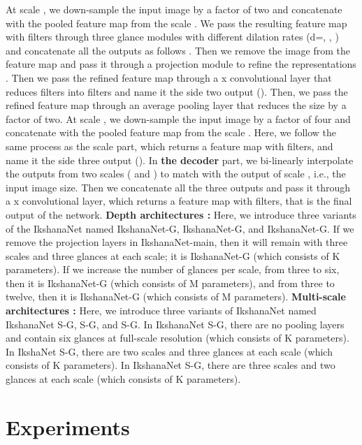\documentclass{article}
\begin{document}
At scale , we down-sample the input image by a factor of two and concatenate with the pooled feature map from the scale  . We pass the resulting feature map with  filters through three glance modules with different dilation rates (d=, , ) and concatenate all the outputs as follows . Then we remove the image from the feature map  and pass it through a  projection module to refine the representations . Then we pass the refined feature map through a x convolutional layer that reduces  filters into  filters and name it the side two output (). Then, we pass the refined feature map through an average pooling layer that reduces the size by a factor of two.\newline
At scale , we down-sample the input image by a factor of four and concatenate with the pooled feature map from the scale  . Here, we follow the same process  as the scale  part, which returns a feature map with  filters, and name it the side three output (). \newline
In \textbf{the decoder} part, we bi-linearly interpolate the outputs from two scales ( and ) to match with the output of scale  , i.e., the input image size. Then we concatenate all the three outputs  and pass it through a x convolutional layer, which returns a feature map with  filters, that is the final output of the network.  \newline
\textbf{Depth architectures :}
Here, we introduce three variants of the IkshanaNet named IkshanaNet-G, IkshanaNet-G, and IkshanaNet-G.  If we remove the projection layers in IkshanaNet-main, then it will remain with three scales and three glances at each scale; it is IkshanaNet-G (which consists of K parameters). If we increase the number of glances per scale, from three to six, then it is IkshanaNet-G (which consists of M parameters), and from three to twelve, then it is IkshanaNet-G (which consists of M parameters).\newline
\textbf{Multi-scale architectures :}
Here, we introduce three variants of IkshanaNet named IkshanaNet S-G, S-G, and S-G. In IkshanaNet S-G, there are no pooling layers and contain six glances at full-scale resolution (which consists of K parameters). In IkshaNet S-G, there are two scales and three glances at each scale (which consists of K parameters). In IkshanaNet S-G, there are three scales and two glances at each scale (which consists of K parameters).


\section{Experiments}
\label{4}
\end{document}
